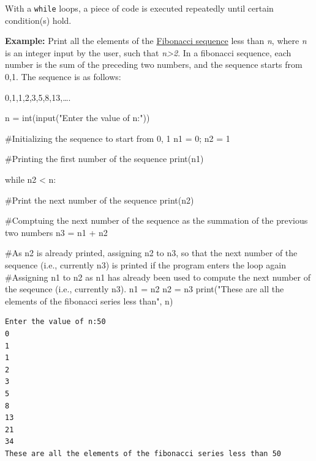 \documentclass[
  letterpaper,
  DIV=11,
  numbers=noendperiod]{scrreprt}
\newenvironment{Shaded}{\begin{snugshade}}{\end{snugshade}}
\newcommand{\BuiltInTok}[1]{\textcolor[rgb]{0.00,0.23,0.31}{#1}}
\newcommand{\CommentTok}[1]{\textcolor[rgb]{0.37,0.37,0.37}{#1}}
\newcommand{\ControlFlowTok}[1]{\textcolor[rgb]{0.00,0.23,0.31}{#1}}
\newcommand{\DecValTok}[1]{\textcolor[rgb]{0.68,0.00,0.00}{#1}}
\newcommand{\NormalTok}[1]{\textcolor[rgb]{0.00,0.23,0.31}{#1}}
\newcommand{\OperatorTok}[1]{\textcolor[rgb]{0.37,0.37,0.37}{#1}}
\newcommand{\StringTok}[1]{\textcolor[rgb]{0.13,0.47,0.30}{#1}}
\begin{document}
With a \texttt{while} loops, a piece of code is executed repeatedly
until certain condition(s) hold.

\textbf{Example:} Print all the elements of the
\href{https://en.wikipedia.org/wiki/Fibonacci_number}{Fibonacci
sequence} less than \emph{n}, where \emph{n} is an integer input by the
user, such that \emph{n\textgreater2}. In a fibonacci sequence, each
number is the sum of the preceding two numbers, and the sequence starts
from 0,1. The sequence is as follows:

0,1,1,2,3,5,8,13,\ldots.

\begin{Shaded}
\begin{Highlighting}[]
\NormalTok{n }\OperatorTok{=} \BuiltInTok{int}\NormalTok{(}\BuiltInTok{input}\NormalTok{(}\StringTok{"Enter the value of n:"}\NormalTok{))}

\CommentTok{\#Initializing the sequence to start from 0, 1}
\NormalTok{n1 }\OperatorTok{=} \DecValTok{0}\OperatorTok{;}\NormalTok{ n2 }\OperatorTok{=} \DecValTok{1}

\CommentTok{\#Printing the first number of the sequence}
\BuiltInTok{print}\NormalTok{(n1)}

\ControlFlowTok{while}\NormalTok{ n2 }\OperatorTok{\textless{}}\NormalTok{ n:}
    
    \CommentTok{\#Print the next number of the sequence}
    \BuiltInTok{print}\NormalTok{(n2)}
    
    \CommentTok{\#Comptuing the next number of the sequence as the summation of the previous two numbers}
\NormalTok{    n3 }\OperatorTok{=}\NormalTok{ n1 }\OperatorTok{+}\NormalTok{ n2}
    
    \CommentTok{\#As n2 is already printed, assigning n2 to n3, so that the next number of the sequence (i.e., currently n3) is printed if the program enters the loop again}
    \CommentTok{\#Assigning n1 to n2 as n1 has already been used to compute the next number of the seqeunce (i.e., currently n3). }
\NormalTok{    n1 }\OperatorTok{=}\NormalTok{ n2}
\NormalTok{    n2 }\OperatorTok{=}\NormalTok{ n3  }
\BuiltInTok{print}\NormalTok{(}\StringTok{"These are all the elements of the fibonacci series less than"}\NormalTok{, n)}
\end{Highlighting}
\end{Shaded}

\begin{verbatim}
Enter the value of n:50
0
1
1
2
3
5
8
13
21
34
These are all the elements of the fibonacci series less than 50
\end{verbatim}
\end{document}
